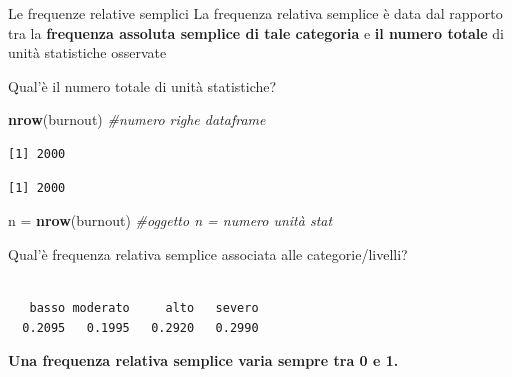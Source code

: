 \documentclass[
  ignorenonframetext,
  compress, aspectratio=149]{beamer}
\newenvironment{Shaded}{\begin{snugshade}}{\end{snugshade}}
\newcommand{\CommentTok}[1]{\textcolor[rgb]{0.56,0.35,0.01}{\textit{#1}}}
\newcommand{\FunctionTok}[1]{\textcolor[rgb]{0.13,0.29,0.53}{\textbf{#1}}}
\newcommand{\NormalTok}[1]{#1}
\newcommand{\OtherTok}[1]{\textcolor[rgb]{0.56,0.35,0.01}{#1}}
\newcommand{\SpecialCharTok}[1]{\textcolor[rgb]{0.81,0.36,0.00}{\textbf{#1}}}
\begin{document}
\begin{frame}[fragile]{Le frequenze relative semplici}
La frequenza relativa semplice è data dal rapporto tra la
\textbf{frequenza assoluta semplice di tale categoria} e \textbf{il
numero totale} di unità statistiche osservate

Qual'è il numero totale di unità statistiche?

\begin{Shaded}
\begin{Highlighting}[]
\FunctionTok{nrow}\NormalTok{(burnout) }\CommentTok{\#numero righe dataframe}
\end{Highlighting}
\end{Shaded}

\begin{verbatim}
[1] 2000
\end{verbatim}

\begin{Shaded}
\end{Shaded}

\begin{verbatim}
[1] 2000
\end{verbatim}

\begin{Shaded}
\begin{Highlighting}[]
\NormalTok{n }\OtherTok{=} \FunctionTok{nrow}\NormalTok{(burnout) }\CommentTok{\#oggetto n = numero unità stat}
\end{Highlighting}
\end{Shaded}
\end{frame}

\begin{frame}[fragile]
Qual'è frequenza relativa semplice associata alle categorie/livelli?

\begin{Shaded}
\end{Shaded}

\begin{verbatim}

   basso moderato     alto   severo 
  0.2095   0.1995   0.2920   0.2990 
\end{verbatim}

\textbf{Una frequenza relativa semplice varia sempre tra 0 e 1.}
\end{frame}
\end{document}
